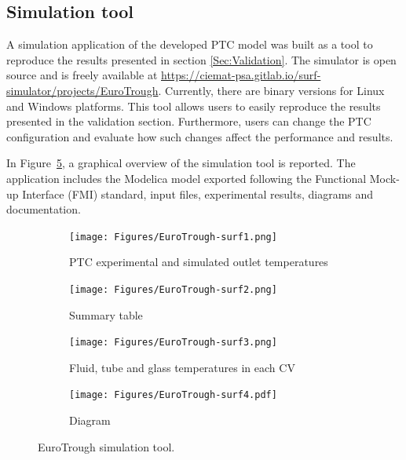 \documentclass[final,3p,times,review]{elsarticle}
\begin{document}
\subsection{Simulation tool} \label{Sec:SimTool}
%
A simulation application of the developed PTC model was built as a tool to reproduce the results presented in section \ref{Sec:Validation}. The simulator is open source and is freely available at \url{https://ciemat-psa.gitlab.io/surf-simulator/projects/EuroTrough}. Currently, there are binary versions for Linux and Windows platforms. This tool allows users to easily reproduce the results presented in the validation section. Furthermore, users can change the PTC configuration and evaluate how such changes affect the performance and results.

In Figure~\ref{fig:SimTool}, a graphical overview of the simulation tool is reported. The application includes the Modelica model exported following the Functional Mock-up Interface (FMI) standard, input files, experimental results, diagrams and documentation.

\begin{figure}[h]
	\centering
	\begin{subfigure}[t]{0.48\textwidth}
		\centering
		\texttt{[image: Figures/EuroTrough-surf1.png]}
		\caption{PTC experimental and simulated outlet temperatures}
		\label{fig:SimTool1}	
	\end{subfigure}
	\begin{subfigure}[t]{0.48\textwidth}
		\centering
		\texttt{[image: Figures/EuroTrough-surf2.png]}
		\caption{Summary table}
		\label{fig:SimTool2}
	\end{subfigure}
	\begin{subfigure}[t]{0.48\textwidth}
		\centering
		\texttt{[image: Figures/EuroTrough-surf3.png]}
		\caption{Fluid, tube and glass temperatures in each CV}
		\label{fig:SimTool3}	
	\end{subfigure}
	\begin{subfigure}[t]{0.48\textwidth}
		\centering
		\texttt{[image: Figures/EuroTrough-surf4.pdf]}
		\caption{Diagram}
		\label{fig:SimTool4}
	\end{subfigure}	
	\caption{EuroTrough simulation tool.}
	\label{fig:SimTool}
\end{figure}
\end{document}
